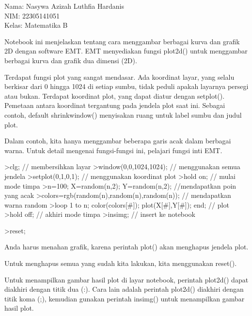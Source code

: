 \documentclass{article}
\begin{document}
\begin{eulernotebook}
\begin{eulercomment}
Nama: Nasywa Azizah Luthfia Hardanis\\
NIM: 22305141051\\
Kelas: Matematika B\\
\end{eulercomment}
\eulersubheading{}
\begin{eulercomment}
Notebook ini menjelaskan tentang cara menggambar berbagai kurva dan
grafik 2D dengan software EMT. EMT menyediakan fungsi plot2d() untuk
menggambar berbagai kurva dan grafik dua dimensi (2D).

\end{eulercomment}
\begin{eulercomment}
Terdapat fungsi plot yang sangat mendasar. Ada koordinat layar, yang
selalu berkisar dari 0 hingga 1024 di setiap sumbu, tidak peduli
apakah layarnya persegi atau bukan. Terdapat koordinat plot, yang
dapat diatur dengan setplot(). Pemetaan antara koordinat tergantung
pada jendela plot saat ini. Sebagai contoh, default shrinkwindow()
menyisakan ruang untuk label sumbu dan judul plot.

Dalam contoh, kita hanya menggambar beberapa garis acak dalam berbagai
warna. Untuk detail mengenai fungsi-fungsi ini, pelajari fungsi inti
EMT.
\end{eulercomment}
\begin{eulerprompt}
>clg; // membersihkan layar
>window(0,0,1024,1024); // menggunakan semua jendela
>setplot(0,1,0,1); // menggunakan koordinat plot
>hold on; // mulai mode timpa
>n=100; X=random(n,2); Y=random(n,2);  //mendapatkan poin yang acak
>colors=rgb(random(n),random(n),random(n)); // mendapatkan warna random
>loop 1 to n; color(colors[#]); plot(X[#],Y[#]); end; // plot
>hold off; // akhiri mode timpa
>insimg; // insert ke notebook
\end{eulerprompt}
\begin{eulerprompt}
>reset;
\end{eulerprompt}
\begin{eulercomment}
Anda harus menahan grafik, karena perintah plot() akan menghapus
jendela plot.

Untuk menghapus semua yang sudah kita lakukan, kita menggunakan
reset().

Untuk menampilkan gambar hasil plot di layar notebook, perintah
plot2d() dapat diakhiri dengan titik dua (:). Cara lain adalah
perintah plot2d() diakhiri dengan titik koma (;), kemudian gunakan
perintah insimg() untuk menampilkan gambar hasil plot.


\end{eulercomment}
\end{eulernotebook}
\end{document}
